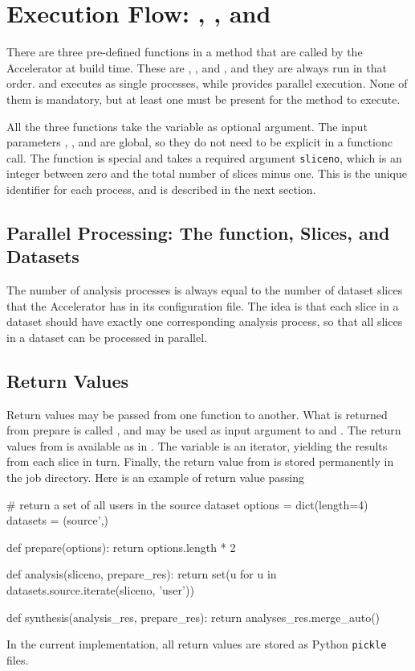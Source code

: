


\newpage
\section{Execution Flow:  \prepare, \analysis, and \synthesis}

There are three pre-defined functions in a method that are called by
the Accelerator at build time.  These are \prepare, \analysis, and
\synthesis, and they are always run in that order.  \prepare and
\synthesis executes as single processes, while \analysis provides
parallel execution.  None of them is mandatory, but at least one must
be present for the method to execute.

All the three functions take the \params variable as optional
argument.  The input parameters \options, \jobids, and \datasets are
global, so they do not need to be explicit in a functionc call.  The
\analysis function is special and takes a required argument
\texttt{sliceno}, which is an integer between zero and the total
number of slices minus one.  This is the unique identifier for each
\analysis process, and is described in the next section.


\subsection{Parallel Processing:  The \analysis function, Slices, and Datasets}
The number of analysis processes is always equal to the number of
dataset slices that the Accelerator has in its configuration file.
The idea is that each slice in a dataset should have exactly one
corresponding analysis process, so that all slices in a dataset can be
processed in parallel.


\subsection{Return Values}
Return values may be passed from one function to another.  What is
returned from prepare is called \prepareres, and may be used as input
argument to \analysis and \synthesis.  The return values from
\analysis is available as \analysisres in \synthesis.  The
\analysisres variable is an iterator, yielding the results from each
slice in turn.  Finally, the return value from \synthesis is stored
permanently in the job directory.  Here is an example of return value
passing
\begin{python}
# return a set of all users in the source dataset
options = dict(length=4)
datasets = (source',)

def prepare(options):
    return options.length * 2

def analysis(sliceno, prepare_res):
    return set(u for u in datasets.source.iterate(sliceno, 'user'))

def synthesis(analysis_res, prepare_res):
     return analyses_res.merge_auto()
\end{python}
In the current implementation, all return values are stored as Python
\texttt{pickle} files.

